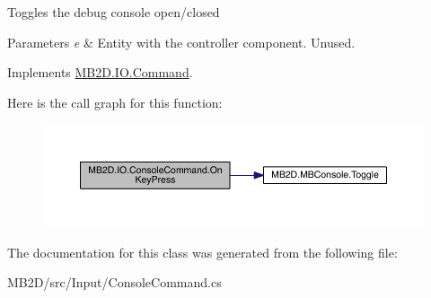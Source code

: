 Toggles the debug console open/closed 


\begin{DoxyParams}{Parameters}
{\em e} & Entity with the controller component. Unused.\\
\hline
\end{DoxyParams}


Implements \hyperlink{class_m_b2_d_1_1_i_o_1_1_command_ae927e36c0e285848325cc68eddb5fd72}{M\+B2\+D.\+I\+O.\+Command}.

Here is the call graph for this function\+:
\nopagebreak
\begin{figure}[H]
\begin{center}
\leavevmode
\includegraphics[width=350pt]{class_m_b2_d_1_1_i_o_1_1_console_command_ad46e036e534b3b1cd1503782042d358f_cgraph}
\end{center}
\end{figure}


The documentation for this class was generated from the following file\+:\begin{DoxyCompactItemize}
\item 
M\+B2\+D/src/\+Input/Console\+Command.\+cs\end{DoxyCompactItemize}
